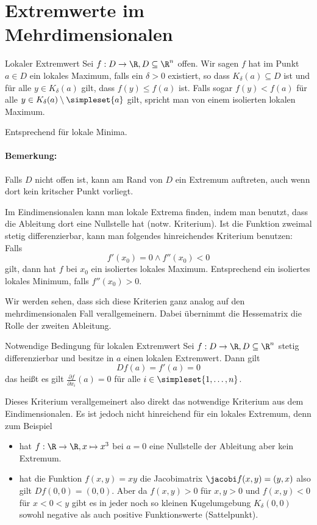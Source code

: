 \section{Extremwerte im Mehrdimensionalen}
\begin{definition}{Lokaler Extremwert}
	Sei $f:D\rightarrow \R,D\subseteq \R^n$ offen. Wir sagen $f$ hat im Punkt $a\in D$ ein lokales Maximum, falls ein $\delta>0$ existiert, so dass $K_\delta(a)\subseteq D$ ist und für alle $y\in K_\delta(a)$ gilt, dass $f(y)\leq f(a)$ ist. Falls sogar $f(y)<f(a)$ für alle $y\in K_\delta(a)\setminus\simpleset{a}$ gilt, spricht man von einem isolierten lokalen Maximum.

	Entsprechend für lokale Minima.
\end{definition}
\paragraph{Bemerkung:}
Falls $D$ nicht offen ist, kann am Rand von $D$ ein Extremum auftreten, auch wenn dort kein kritscher Punkt vorliegt.

\par\medskip

Im Eindimensionalen kann man lokale Extrema finden, indem man benutzt, dass die Ableitung dort eine Nullstelle hat (notw. Kriterium). Ist die Funktion zweimal stetig differenzierbar, kann man folgendes hinreichendes Kriterium benutzen: Falls
\begin{equation*}
	f'(x_0)=0 \wedge f''(x_0)<0
\end{equation*}
gilt, dann hat $f$ bei $x_0$ ein isoliertes lokales Maximum. Entsprechend ein isoliertes lokales Minimum, falls $f''(x_0)>0$.

Wir werden sehen, dass sich diese Kriterien ganz analog auf den mehrdimensionalen Fall verallgemeinern. Dabei übernimmt die Hessematrix die Rolle der zweiten Ableitung.

\begin{satz}{Notwendige Bedingung für lokalen Extremwert}
	Sei $f:D\rightarrow \R,D\subseteq \R^n$ stetig differenzierbar und besitze in $a$ einen lokalen Extremwert. Dann gilt
	\begin{equation*}
		Df(a)=f'(a)=0
	\end{equation*}
	das heißt es gilt $\frac{\partial f}{\partial x_i}(a)=0$ für alle $i\in\simpleset{1,\ldots,n}$.
\end{satz}
Dieses Kriterium verallgemeinert also direkt das notwendige Kriterium aus dem Eindimensionalen. Es ist jedoch nicht hinreichend für ein lokales Extremum, denn zum Beispiel
\begin{itemize}
	\item hat $f:\R\rightarrow\R,x\mapsto x^3$ bei $a=0$ eine Nullstelle der Ableitung aber kein Extremum.
	\item hat die Funktion $f(x,y)=xy$ die Jacobimatrix $\jacobi f(x,y)=(y,x)$ also gilt $Df(0,0)=(0,0)$. Aber da $f(x,y)>0$ für $x,y>0$ und $f(x,y)<0$ für $x<0<y$ gibt es in jeder noch so kleinen Kugelumgebung $K_\delta (0,0)$ sowohl negative als auch positive Funktionswerte (Sattelpunkt).
\end{itemize}

